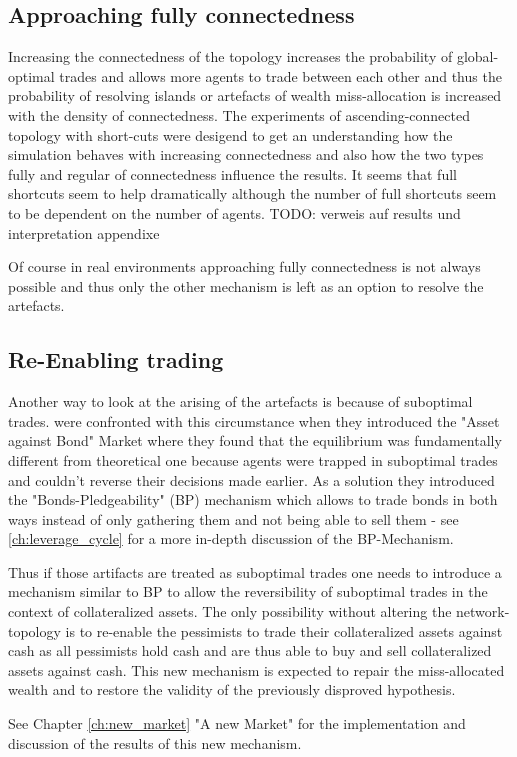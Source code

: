 \documentclass[Bachelorarbeit.tex]{subfiles}
\begin{document}
\subsection{Approaching fully connectedness}
Increasing the connectedness of the topology increases the probability of global-optimal trades and allows more agents to trade between each other and thus the probability of resolving islands or artefacts of wealth miss-allocation is increased with the density of connectedness.
The experiments of ascending-connected topology with short-cuts were desigend to get an understanding how the simulation behaves with increasing connectedness and also how the two types fully and regular of connectedness influence the results.
It seems that full shortcuts seem to help dramatically although the number of full shortcuts seem to be dependent on the number of agents.
TODO: verweis auf results und interpretation appendixe

Of course in real environments approaching fully connectedness is not always possible and thus only the other mechanism is left as an option to resolve the artefacts.

\subsection{Re-Enabling trading}
Another way to look at the arising of the artefacts is because of suboptimal trades. \cite{Breuer2015} were confronted with this circumstance when they introduced the "Asset against Bond" Market where they found that the equilibrium was fundamentally different from theoretical one because agents were trapped in suboptimal trades and couldn't reverse their decisions made earlier. As a solution they introduced the "Bonds-Pledgeability" (BP) mechanism which allows to trade bonds in both ways instead of only gathering them and not being able to sell them - see \ref{ch:leverage_cycle} for a more in-depth discussion of the BP-Mechanism.

\medskip 

Thus if those artifacts are treated as suboptimal trades one needs to introduce a mechanism similar to BP to allow the reversibility of suboptimal trades in the context of collateralized assets. The only possibility without altering the network-topology is to re-enable the pessimists to trade their collateralized assets against cash as all pessimists hold cash and are thus able to buy and sell collateralized assets against cash. This new mechanism is expected to repair the miss-allocated wealth and to restore the validity of the previously disproved hypothesis.

\medskip 

See Chapter \ref{ch:new_market} "A new Market" for the implementation and discussion of the results of this new mechanism.
\end{document}
